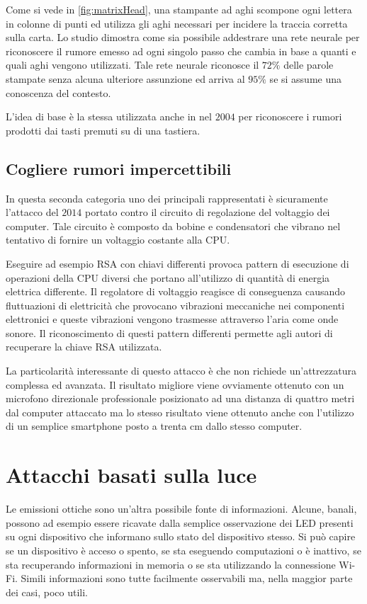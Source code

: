			Come si vede in \cref{fig:matrixHead}, una stampante ad aghi scompone ogni lettera in colonne di punti ed utilizza gli aghi necessari per incidere la traccia corretta sulla carta. Lo studio dimostra come sia possibile addestrare una rete neurale per riconoscere il rumore emesso ad ogni singolo passo che cambia in base a quanti e quali aghi vengono utilizzati. Tale rete neurale riconosce il $72\%$ delle parole stampate senza alcuna ulteriore assunzione ed arriva al $95\%$ se si assume una conoscenza del contesto.
			
			L'idea di base è la stessa utilizzata anche in \cite{asonov2004keyboard} nel $2004$ per riconoscere i rumori prodotti dai tasti premuti su di una tastiera.
		
		\subsection{Cogliere rumori impercettibili}	
			In questa seconda categoria uno dei principali rappresentati è sicuramente l'attacco\cite{genkin2014rsa} del $2014$ portato contro il circuito di regolazione del voltaggio dei computer. Tale circuito è composto da bobine e condensatori che vibrano nel tentativo di fornire un voltaggio costante alla CPU.
			
			Eseguire ad esempio RSA con chiavi differenti provoca pattern di esecuzione di operazioni della CPU diversi che portano all'utilizzo di quantità di energia elettrica differente. Il regolatore di voltaggio reagisce di conseguenza causando fluttuazioni di elettricità che provocano vibrazioni meccaniche nei componenti elettronici e queste vibrazioni vengono trasmesse attraverso l'aria come onde sonore. Il riconoscimento di questi pattern differenti permette agli autori di recuperare la chiave RSA utilizzata.
			
			La particolarità interessante di questo attacco è che non richiede un'attrezzatura complessa ed avanzata. Il risultato migliore viene ovviamente ottenuto con un microfono direzionale professionale posizionato ad una distanza di quattro metri dal computer attaccato ma lo stesso risultato viene ottenuto anche con l'utilizzo di un semplice smartphone posto a trenta cm dallo stesso computer.
			
	\section{Attacchi basati sulla luce}
		Le emissioni ottiche sono un'altra possibile fonte di informazioni. Alcune, banali, possono ad esempio essere ricavate dalla semplice osservazione dei \acs{LED} presenti su ogni dispositivo che informano sullo stato del dispositivo stesso. Si può capire se un dispositivo è acceso o spento, se sta eseguendo computazioni o è inattivo, se sta recuperando informazioni in memoria o se sta utilizzando la connessione Wi-Fi. Simili informazioni sono tutte facilmente osservabili ma, nella maggior parte dei casi, poco utili.
		
